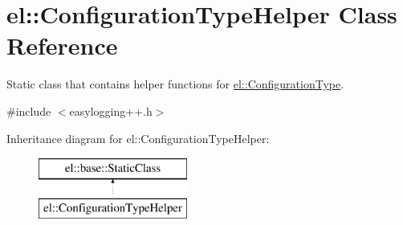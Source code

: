 \hypertarget{classel_1_1_configuration_type_helper}{}\section{el\+:\+:Configuration\+Type\+Helper Class Reference}
\label{classel_1_1_configuration_type_helper}


Static class that contains helper functions for \hyperlink{namespaceel_a281f5db6d6163678bc68a8b23b59e124}{el\+::\+Configuration\+Type}.  




{\ttfamily \#include $<$easylogging++.\+h$>$}

Inheritance diagram for el\+:\+:Configuration\+Type\+Helper\+:\begin{figure}[H]
\begin{center}
\leavevmode
\includegraphics[height=2.000000cm]{classel_1_1_configuration_type_helper}
\end{center}
\end{figure}
